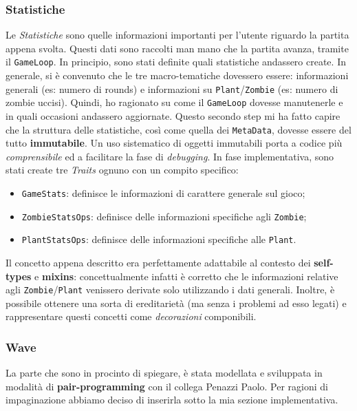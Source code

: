\subsubsection{Statistiche}
Le \textit{Statistiche} sono quelle informazioni importanti per l'utente riguardo la partita appena svolta. Questi dati sono raccolti man mano che la partita avanza, tramite il \texttt{GameLoop}. In principio, sono stati definite quali statistiche andassero create. In generale, si è convenuto che le tre macro-tematiche dovessero essere: informazioni generali (es: numero di rounds) e informazioni su \texttt{Plant}/\texttt{Zombie} (es: numero di zombie uccisi). Quindi, ho ragionato su come il \texttt{GameLoop} dovesse manutenerle e in quali occasioni andassero aggiornate. Questo secondo step mi ha fatto capire che la struttura delle statistiche, così come quella dei \texttt{MetaData}, dovesse essere del tutto \textbf{immutabile}. Un uso sistematico di oggetti immutabili porta a codice più \textit{comprensibile} ed a facilitare la fase di \textit{debugging}. In fase implementativa, sono stati create tre \textit{Traits} ognuno con un compito specifico:
\begin{itemize}
    \item \texttt{GameStats}: definisce le informazioni di carattere generale sul gioco;
    \item \texttt{ZombieStatsOps}: definisce delle informazioni specifiche agli \texttt{Zombie};
    \item \texttt{PlantStatsOps}: definisce delle informazioni specifiche alle \texttt{Plant}.
\end{itemize}
Il concetto appena descritto era perfettamente adattabile al contesto dei \textbf{self-types} e \textbf{mixins}: concettualmente infatti è corretto che le informazioni relative agli \texttt{Zombie}/\texttt{Plant} venissero derivate solo utilizzando i dati generali. Inoltre, è possibile ottenere una sorta di ereditarietà (ma senza i problemi ad esso legati) e rappresentare questi concetti come \textit{decorazioni} componibili.



\subsubsection{Wave}
La parte che sono in procinto di spiegare, è stata modellata e sviluppata in modalità di \textbf{pair-programming} con il collega Penazzi Paolo. Per ragioni di impaginazione abbiamo deciso di inserirla sotto la mia sezione implementativa.\\

